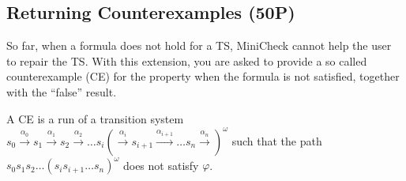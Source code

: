 \subsection{Returning Counterexamples (50P)}
So far, when a formula does not hold for a TS, MiniCheck cannot help the user to repair the TS. With 
this extension, you are asked to provide a so called counterexample (CE) for the property when the formula is not 
satisfied, together with the ``false'' result.

A CE is a run of a transition system $s_0 \xrightarrow[]{\alpha_0} s_1 \xrightarrow[]{\alpha_1} s_2 \xrightarrow[]{\alpha_2} \dots s_i (\xrightarrow[]{\alpha_i} s_{i+1} \xrightarrow[]{\alpha_{i+1}} \dots s_n \xrightarrow[]{\alpha_n})^{\omega}$ such 
that the path $s_0s_1s_2 \dots (s_is_{i+1} \dots s_n )^{\omega}$ does not satisfy $\varphi$.
